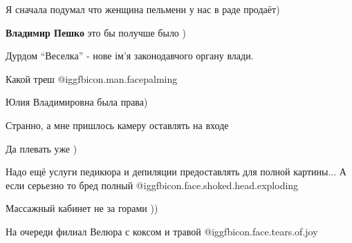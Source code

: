  
 
 
 
 
\zzSecCmt

\begin{itemize} %
Я сначала подумал что женщина пельмени у нас в раде продаёт)

\textbf{Владимир Пешко} это бы получше было )

Дурдом \enquote{Веселка} - нове ім'я законодавчого органу влади.

Какой треш  @igg{fbicon.man.facepalming} 

Юлия Владимировна была права)

Странно, а мне пришлось камеру оставлять на входе

Да плевать уже )

Надо ещё услуги педикюра и депиляции предоставлять для полной картины... А если серьезно то бред полный  @igg{fbicon.face.shoked.head.exploding} 

Массажный кабинет не за горами ))

На очереди филиал Велюра с коксом и травой @igg{fbicon.face.tears.of.joy} 
\end{itemize} %
